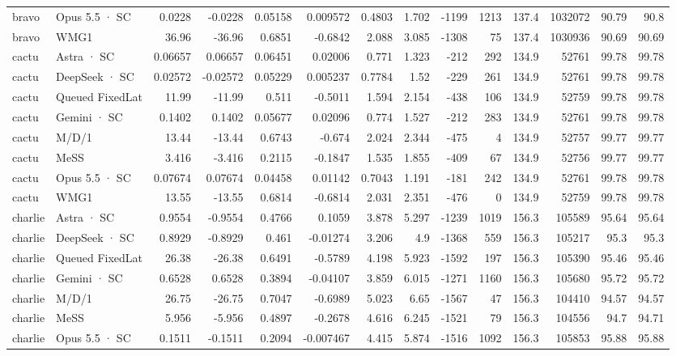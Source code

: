 \begin{tabular}{llrrrrrrrrrrrr}
bravo & Opus 5.5 · SC & 0.0228 & -0.0228 & 0.05158 & 0.009572 & 0.4803 & 1.702 & -1199 & 1213 & 137.4 & 1032072 & 90.79 & 90.8 \\
bravo & WMG1 & 36.96 & -36.96 & 0.6851 & -0.6842 & 2.088 & 3.085 & -1308 & 75 & 137.4 & 1030936 & 90.69 & 90.69 \\
cactu & Astra · SC & 0.06657 & 0.06657 & 0.06451 & 0.02006 & 0.771 & 1.323 & -212 & 292 & 134.9 & 52761 & 99.78 & 99.78 \\
cactu & DeepSeek · SC & 0.02572 & -0.02572 & 0.05229 & 0.005237 & 0.7784 & 1.52 & -229 & 261 & 134.9 & 52761 & 99.78 & 99.78 \\
cactu & Queued FixedLat & 11.99 & -11.99 & 0.511 & -0.5011 & 1.594 & 2.154 & -438 & 106 & 134.9 & 52759 & 99.78 & 99.78 \\
cactu & Gemini · SC & 0.1402 & 0.1402 & 0.05677 & 0.02096 & 0.774 & 1.527 & -212 & 283 & 134.9 & 52761 & 99.78 & 99.78 \\
cactu & M/D/1 & 13.44 & -13.44 & 0.6743 & -0.674 & 2.024 & 2.344 & -475 & 4 & 134.9 & 52757 & 99.77 & 99.77 \\
cactu & MeSS & 3.416 & -3.416 & 0.2115 & -0.1847 & 1.535 & 1.855 & -409 & 67 & 134.9 & 52756 & 99.77 & 99.77 \\
cactu & Opus 5.5 · SC & 0.07674 & 0.07674 & 0.04458 & 0.01142 & 0.7043 & 1.191 & -181 & 242 & 134.9 & 52761 & 99.78 & 99.78 \\
cactu & WMG1 & 13.55 & -13.55 & 0.6814 & -0.6814 & 2.031 & 2.351 & -476 & 0 & 134.9 & 52759 & 99.78 & 99.78 \\
charlie & Astra · SC & 0.9554 & -0.9554 & 0.4766 & 0.1059 & 3.878 & 5.297 & -1239 & 1019 & 156.3 & 105589 & 95.64 & 95.64 \\
charlie & DeepSeek · SC & 0.8929 & -0.8929 & 0.461 & -0.01274 & 3.206 & 4.9 & -1368 & 559 & 156.3 & 105217 & 95.3 & 95.3 \\
charlie & Queued FixedLat & 26.38 & -26.38 & 0.6491 & -0.5789 & 4.198 & 5.923 & -1592 & 197 & 156.3 & 105390 & 95.46 & 95.46 \\
charlie & Gemini · SC & 0.6528 & 0.6528 & 0.3894 & -0.04107 & 3.859 & 6.015 & -1271 & 1160 & 156.3 & 105680 & 95.72 & 95.72 \\
charlie & M/D/1 & 26.75 & -26.75 & 0.7047 & -0.6989 & 5.023 & 6.65 & -1567 & 47 & 156.3 & 104410 & 94.57 & 94.57 \\
charlie & MeSS & 5.956 & -5.956 & 0.4897 & -0.2678 & 4.616 & 6.245 & -1521 & 79 & 156.3 & 104556 & 94.7 & 94.71 \\
charlie & Opus 5.5 · SC & 0.1511 & -0.1511 & 0.2094 & -0.007467 & 4.415 & 5.874 & -1516 & 1092 & 156.3 & 105853 & 95.88 & 95.88 \\

\end{tabular}
